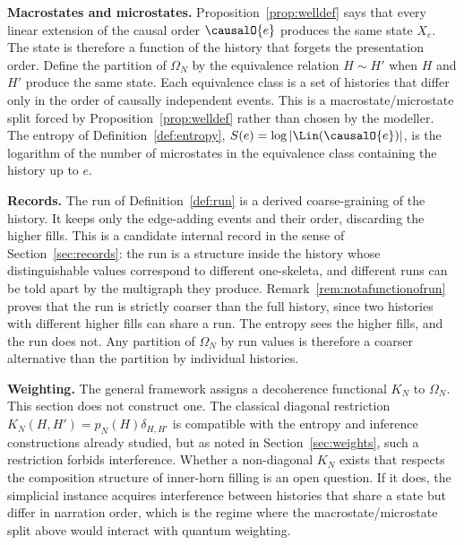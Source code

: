 \textbf{Macrostates and microstates.}
Proposition~\ref{prop:welldef} says that every linear extension of the
causal order $\causalO{e}$ produces the same state $X_e$.
The state is therefore a function of the history that forgets the
presentation order.
Define the partition of $\Omega_N$ by the equivalence relation
$H \sim H'$ when $H$ and $H'$ produce the same state.
Each equivalence class is a set of histories that differ only in the
order of causally independent events.
This is a macrostate/microstate split forced by Proposition~\ref{prop:welldef}
rather than chosen by the modeller.
The entropy of Definition~\ref{def:entropy},
$S(e) = \log |\Lin(\causalO{e})|$, is the logarithm of the number of
microstates in the equivalence class containing the history up to $e$.

\textbf{Records.}
The run of Definition~\ref{def:run} is a derived coarse-graining of the
history.
It keeps only the edge-adding events and their order, discarding the
higher fills.
This is a candidate internal record in the sense of
Section~\ref{sec:records}: the run is a structure inside the history
whose distinguishable values correspond to different one-skeleta, and
different runs can be told apart by the multigraph they produce.
Remark~\ref{rem:notafunctionofrun} proves that the run is strictly
coarser than the full history, since two histories with different higher
fills can share a run.
The entropy sees the higher fills, and the run does not.
Any partition of $\Omega_N$ by run values is therefore a coarser
alternative than the partition by individual histories.

\textbf{Weighting.}
The general framework assigns a decoherence functional $K_N$ to
$\Omega_N$.
This section does not construct one.
The classical diagonal restriction $K_N(H,H') = p_N(H)\delta_{H,H'}$ is
compatible with the entropy and inference constructions already studied,
but as noted in Section~\ref{sec:weights}, such a restriction forbids
interference.
Whether a non-diagonal $K_N$ exists that respects the composition
structure of inner-horn filling is an open question.
If it does, the simplicial instance acquires interference between
histories that share a state but differ in narration order, which is the
regime where the macrostate/microstate split above would interact with
quantum weighting.

